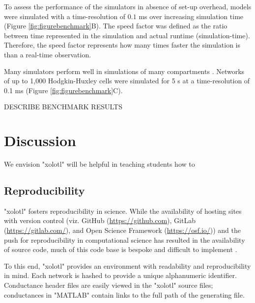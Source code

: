 \documentclass{frontiersSCNS} %
\begin{document}
To assess the performance of the simulators in absence of set-up overhead, models were simulated with a time-resolution of $0.1$ ms over increasing simulation time (Figure \ref{fig:figurebenchmark}B). The speed factor was defined as the ratio between time represented in the simulation and actual runtime (simulation-time). Therefore, the speed factor represents how many times faster the simulation is than a real-time observation.

Many simulators perform well in simulations of many compartments \autocite{bretteSimulationNetworksSpiking2007, sherfeyDynaSimMATLABToolbox2018, vitayANNarchyCodeGeneration2015, delormeSpikeNETEventdrivenSimulation2003}. Networks of up to 1,000 Hodgkin-Huxley cells were simulated for 5 s at a time-resolution of 0.1 ms (Figure \ref{fig:figurebenchmark}C).

DESCRIBE BENCHMARK RESULTS

%
%
%
%
%
%

\section{Discussion}
\label{discussion}

We envision "xolotl" will be helpful in teaching students how to 

\subsection{Reproducibility}

"xolotl" fosters reproducibility in science. While the availability of hosting sites with version control (viz. GitHub (\url{https://github.com}), GitLab (\url{https://gitlab.com/}), and Open Science Framework (\url{https://osf.io/})) and the push for reproducibility in computational science \autocite{eklundClusterFailureWhy2016, stoddenEnhancingReproducibilityComputational2016, bakerWhyScientistsMust2016} has resulted in the availability of source code, much of this code base is bespoke and difficult to implement \autocite{sedanoCodeReadabilityTesting2016, xuMeasurementSourceCode2017}.

To this end, "xolotl" provides an environment with readability and reproducibility in mind. Each network is hashed to provide a unique alphanumeric identifier. Conductance header files are easily viewed in the "xolotl" source files; conductances in "MATLAB" contain links to the full path of the generating file.
\end{document}
